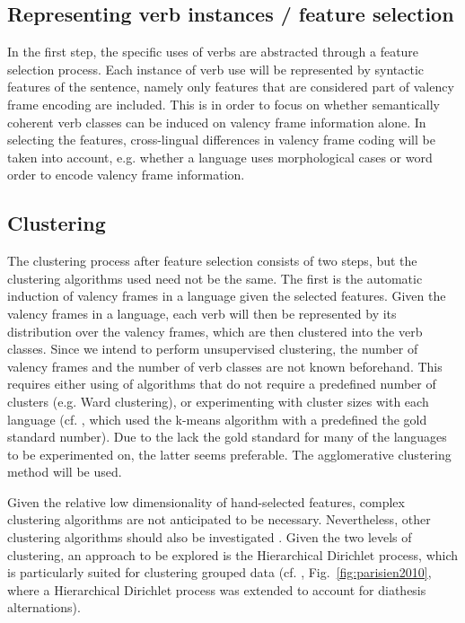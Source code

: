 \subsection{Representing verb instances / feature selection}\label{subsec:features}

In the first step, the specific uses of verbs are abstracted through a feature selection process. Each instance of verb use will be represented by syntactic features of the sentence, namely only features that are considered part of valency frame encoding are included. This is in order to focus on whether semantically coherent verb classes can be induced on valency frame information alone. In selecting the features, cross-lingual differences in valency frame coding will be taken into account, e.g. whether a language uses morphological cases or word order to encode valency frame information.  


\subsection{Clustering}\label{subsec:clustering}

The clustering process after feature selection consists of two steps, but the clustering algorithms used need not be the same. The first is the automatic induction of valency frames in a language given the selected features. Given the valency frames in a language, each verb will then be represented by its distribution over the valency frames, which are then clustered into the verb classes. Since we intend to perform unsupervised clustering, the number of valency frames and the number of verb classes are not known beforehand. This requires either using of algorithms that do not require a predefined number of clusters (e.g. Ward clustering), or experimenting with cluster sizes with each language (cf. \cite{schulteimwalde2006}, which used the k-means algorithm with a predefined the gold standard number). Due to the lack the gold standard for many of the languages to be experimented on, the latter seems preferable. The agglomerative clustering method will be used.

Given the relative low dimensionality of hand-selected features, complex clustering algorithms are not anticipated to be necessary. Nevertheless, other clustering algorithms should also be investigated \citep{xu2015a}. Given the two levels of clustering, an approach to be explored is the Hierarchical Dirichlet process, which is particularly suited for clustering grouped data (cf. \citet{parisien2010}, Fig.~\ref{fig:parisien2010}, where a Hierarchical Dirichlet process was extended to account for diathesis alternations).

